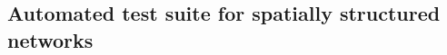 \begin{landscape}
\titlespacing*{\chapter}{0pt}{-30pt}{7pt}
\titleformat{\chapter}[display]{\normalfont\huge\bfseries}{\chaptertitlename\ \thechapter}{4pt}{\Huge}
\chapter{Automated test suite for spatially structured networks\label{app:unit-spatial}}
\setlength{\columnsep}{0.9cm}
\begin{multicols*}{2}

\end{multicols*}
\end{landscape}



\setlength{\topmargin}{\oldtopmargin}
\setlength{\oddsidemargin}{\oldoddsidemargin}
\setlength{\evensidemargin}{\oldevensidemargin}
\setlength{\textwidth}{\oldtextwidth}
\setlength{\textheight}{\oldtextheight}
\setlength{\marginparwidth}{\oldmarginparwidth}
\setlength{\footskip}{\oldfootskip}
\setlength{\headwidth}{\oldheadwidth}
\setlength{\voffset}{\oldvoffset}
\setlength{\hoffset}{\oldhoffset}
\restoregeometry



\clearchapter

